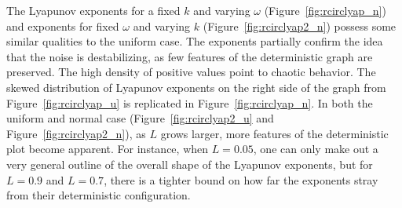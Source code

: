 The Lyapunov exponents for a fixed $k$ and varying $\omega$
(Figure~\ref{fig:rcirclyap_n}) and exponents for fixed $\omega$ and
varying $k$ (Figure~\ref{fig:rcirclyap2_n}) possess some similar
qualities to the uniform case. The exponents partially confirm the
idea that the noise is destabilizing, as few features of the
deterministic graph are preserved. The high density of positive values
point to chaotic behavior. The skewed distribution of Lyapunov exponents on the right side of the graph from
Figure~\ref{fig:rcirclyap_u} is replicated in
Figure~\ref{fig:rcirclyap_n}. In both the uniform and normal case
(Figure~\ref{fig:rcirclyap2_u} and Figure~\ref{fig:rcirclyap2_n}), as $L$ grows larger, more features
of the deterministic plot become apparent. For instance, when
$L=0.05$, one can only make out a very general outline of the overall
shape of the Lyapunov exponents, but for $L=0.9$ and $L=0.7$, there is a tighter
bound on how far the exponents stray from their deterministic configuration. 

